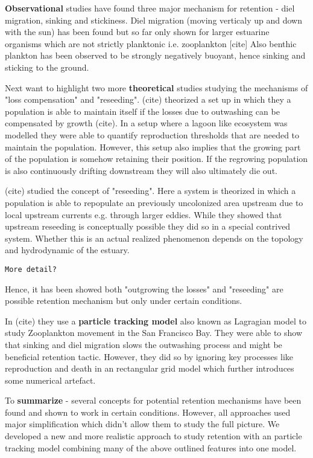 \textbf{Observational} studies have found three major mechanism for retention - diel migration, sinking and stickiness.
Diel migration (moving verticaly up and down with the sun) has been found but so far only shown for larger estuarine organisms which are not strictly planktonic i.e. zooplankton [cite]
Also benthic plankton has been observed to be strongly negatively buoyant, hence sinking and sticking to the ground.

Next want to highlight two more \textbf{theoretical} studies studying the mechanisms of "loss compensation" and "reseeding".
(cite) theorized a set up in which they  a population is able to maintain itself if the losses due to outwashing can be compensated by growth (cite).
In a setup where a lagoon like ecosystem was modelled they were able to quantify reproduction thresholds that are needed to maintain the population.
However, this setup also implies that the growing part of the population is somehow retaining their position.
If the regrowing population is also continuously drifting downstream they will also ultimately die out.

(cite) studied the concept of "reseeding".
Here a system is theorized in which a population is able to repopulate an previously 
uncolonized area upstream due to local upstream currents e.g. through larger eddies.
While they showed that upstream reseeding is conceptually possible they did so in a special contrived system.
Whether this is an actual realized phenomenon depends on the topology and hydrodynamic of the estuary.

\smallskip
\texttt{More detail?}
\smallskip

Hence, it has been showed both "outgrowing the losses" and "reseeding" are possible retention mechanism but only under certain conditions.



In (cite) they use a \textbf{particle tracking model} also known as Lagragian model to study Zooplankton movement in the San Francisco Bay.
They were able to show  that sinking and diel migration slows the outwashing process and might be beneficial retention tactic.
However, they did so by ignoring key processes like reproduction and death in an rectangular grid model
which further introduces some numerical artefact.


To \textbf{summarize} - several concepts for potential retention mechanisms have been found
 and shown to work in certain conditions.
However, all approaches used major simplification which didn't allow them to study the full picture.
We developed a new and more realistic approach to study retention with an particle tracking model combining
 many of the above outlined features into one model.

